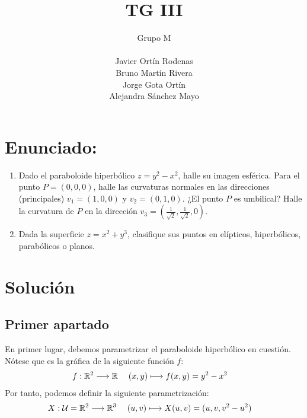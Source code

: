 \documentclass{article}
\title{TG III}
\author{
    \large{Grupo M} \\\\
    Javier Ortín Rodenas \\
    Bruno Martín Rivera \\
    Jorge Gota Ortín \\
    Alejandra Sánchez Mayo
}
\date{}
\begin{document}
\maketitle
\noindent
\section{Enunciado:}
\begin{enumerate}
    \item Dado el paraboloide hiperbólico $z = y^2 - x^2$, halle su imagen esférica.
        Para el punto $P = (0,0,0)$, halle las curvaturas normales en las direcciones
        (principales) $v_1 = (1,0,0)$ y $v_2 = (0,1,0)$. ¿El punto $P$ es umbilical?
        Halle la curvatura de $P$ en la dirección $v_3 = \left(\frac{1}{\sqrt{2}}, \frac{1}{\sqrt{2}}, 0 \right)$.
    \item Dada la superficie $z = x^2 + y^3$, clasifique sus puntos en elípticos, hiperbólicos, parabólicos o planos.
\end{enumerate}

\section{Solución}
\subsection{Primer apartado}
\hspace{1mm} En primer lugar, debemos parametrizar el paraboloide hiperbólico en cuestión.
Nótese que es la gráfica de la siguiente función $f$:
\begin{align*}
    f : \mathbb{R}^2 \longrightarrow \mathbb{R} \hspace{3ex}
    & (x,y) \longmapsto f(x,y) = y^2 - x^2
\end{align*}
\noindent
Por tanto, podemos definir la siguiente parametrización:
\begin{align*}
    X : \mathcal{U} = \mathbb{R}^2 \longrightarrow \mathbb{R}^3 \hspace{3ex}
    & (u,v) \longmapsto X(u,v) = (u,v,v^2 - u^2)
\end{align*}
\end{document}
